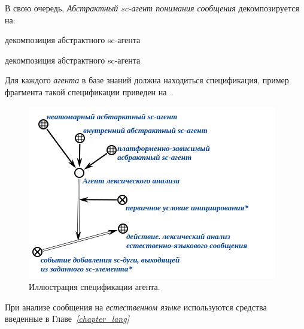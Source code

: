 В свою очередь, \textit{Абстрактный sc-агент понимания сообщения} декомпозируется на:

\begin{SCn}

    \begin{scnrelfromset}{декомпозиция абстрактного sc-агента}
        \begin{scnindent}
            \begin{scnrelfromset}{декомпозиция абстрактного sc-агента}
            \end{scnrelfromset}
        \end{scnindent}
    \end{scnrelfromset}

\end{SCn}

Для каждого \textit{агента} в базе знаний должна находиться спецификация, пример фрагмента такой спецификации приведен на~\textit{}.

\begin{figure}[h]
    \centering
    \includegraphics[scale=0.8]{images/part4/chapter_nl_interfaces/agent_spec}
    \caption{Иллюстрация спецификации агента.}
    \label{fig:agent_spec}
\end{figure}

При анализе сообщения на \textit{естественном языке} используются средства введенные в Главе~\textit{\ref{chapter_lang}~}

